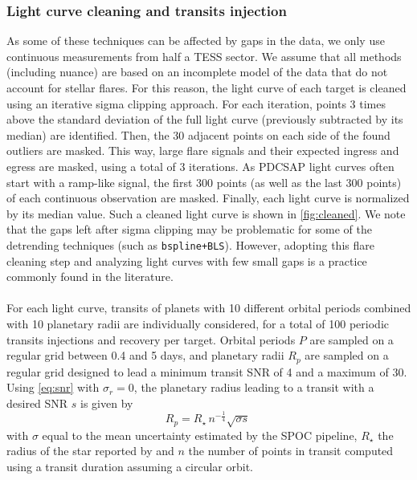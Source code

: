 \documentclass{aastex631}
\begin{document}
\subsubsection*{Light curve cleaning and transits injection}

As some of these techniques can be affected by gaps in the data, we only use continuous measurements from half a TESS sector. We assume that all methods (including nuance) are based on an incomplete model of the data that do not account for stellar flares. For this reason, the light curve of each target is cleaned using an iterative sigma clipping approach. For each iteration, points 3 times above the standard deviation of the full light curve (previously subtracted by its median) are identified. Then, the 30 adjacent points on each side of the found outliers are masked. This way, large flare signals and their expected ingress and egress are masked, using a total of 3 iterations. As PDCSAP light curves often start with a ramp-like signal, the first 300 points (as well as the last 300 points) of each continuous observation are masked. Finally, each light curve is normalized by its median value. Such a cleaned light curve is shown in \autoref{fig:cleaned}. We note that the gaps left after sigma clipping may be problematic for some of the detrending techniques (such as \texttt{bspline+BLS}). However, adopting this flare cleaning step and analyzing light curves with few small gaps is a practice commonly found in the literature.\\\\
For each light curve, transits of planets with 10 different orbital periods combined with 10 planetary radii are individually considered, for a total of 100 periodic transits injections and recovery per target. Orbital periods $P$ are sampled on a regular grid between 0.4 and 5 days, and planetary radii $R_p$ are sampled on a regular grid designed to lead a minimum transit SNR of 4 and a maximum of 30. Using \autoref{eq:snr} with $\sigma_r = 0$, the planetary radius leading to a transit with a desired SNR $s$ is given by
\begin{equation*}
    R_p = R_{\star}\,n^{-\frac{1}{4}} \sqrt{\sigma s}\ %
\end{equation*}
with $\sigma$ equal to the mean uncertainty estimated by the SPOC pipeline, $R_\star$ the radius of the star reported by \cite{Ramsay2020} and $n$ the number of points in transit computed using a transit duration assuming a circular orbit.
\end{document}
